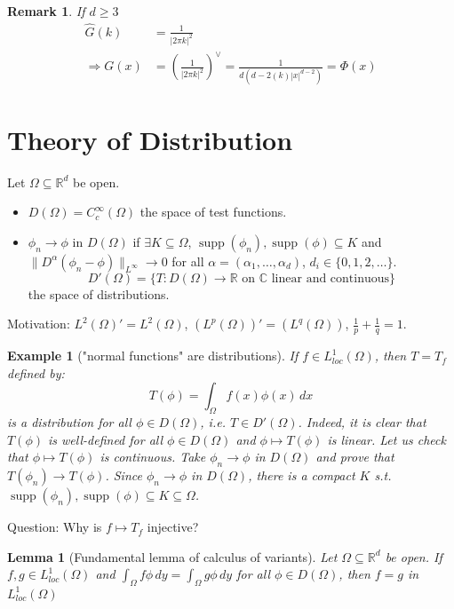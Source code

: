 \documentclass{report}
\theoremstyle{tommy}
\newtheorem{lem}[defn]{Lemma}
\newtheorem{eg}[defn]{Example}
\newtheorem{rem}[defn]{Remark}
\newcommand{\supp}{\operatorname{supp}}
\begin{document}
  \begin{rem}
    If \(d \ge 3\)
    \begin{align*}
      \hat G(k) 
      &= \frac{1}{|2 \pi k|^2}  \\
      \Rightarrow G(x) 
      &= \left(\frac{1}{|2 \pi k|^2}\right)^\lor
      = \frac{1}{d(d-2(k) |x|^{d-2})} 
      = \Phi(x)
    \end{align*}
  \end{rem}

  \section{Theory of Distribution}
  Let \(\Omega \subseteq \mathbb{R}^d\) be open.
  \begin{itemize}
    \item \(D(\Omega) = C_c^\infty(\Omega)\) the space of test functions.
    \item \(\phi_n \to \phi\) in \(D(\Omega)\) if \(\exists K \subseteq \Omega\), \(\supp(\phi_n), \supp(\phi) \subseteq K\) and \(\|D^\alpha(\phi_n - \phi)\|_{L^\infty} \to 0\) for all \(\alpha = (\alpha_1, \dots, \alpha_d)\), \(d_i \in \{0, 1, 2, \dots\}\).
    \[D'(\Omega) = \{T: D(\Omega) \to \mathbb{R} \text{ on } \mathbb{C} \text{ linear and continuous}\}\] the space of distributions.
  \end{itemize}

  Motivation: \(L^2(\Omega)' = L^2(\Omega)\), \((L^p(\Omega))' = (L^q(\Omega))\), \(\frac{1}{p} + \frac{1}{q} = 1\).


  \begin{eg}["normal functions" are distributions]
    If \(f \in L_{loc}^1(\Omega)\), then \(T = T_f\) defined by:
    \[T(\phi) = \int_{\Omega} f(x) \phi(x) \, dx\]
    is a distribution for all \(\phi \in D(\Omega)\), i.e. \(T \in D'(\Omega)\). Indeed, it is clear that \(T(\phi)\) is well-defined for all \(\phi \in D(\Omega)\) and \(\phi \mapsto T(\phi)\) is linear. Let us check that \(\phi \mapsto T(\phi)\) is continuous. Take \(\phi_n \to \phi\) in \(D(\Omega)\) and prove that \(T(\phi_n) \to T(\phi)\). Since \(\phi_n \to \phi\) in \(D(\Omega)\), there is a compact \(K\) s.t. \(\supp(\phi_n), \supp(\phi) \subseteq K \subseteq \Omega\).
  \end{eg}

  Question: Why is \(f \mapsto T_f\) injective?

  \begin{lem}[Fundamental lemma of calculus of variants]
    Let \(\Omega \subseteq \mathbb{R}^d\) be open. If \(f, g \in L_{loc}^1(\Omega)\) and 
    \(\int_\Omega f \phi \, dy = \int_{\Omega} g \phi \, dy\) for all \(\phi \in D(\Omega) \), then \(f = g\) in \(L_{loc}^1(\Omega)\)
  \end{lem}
\end{document}

